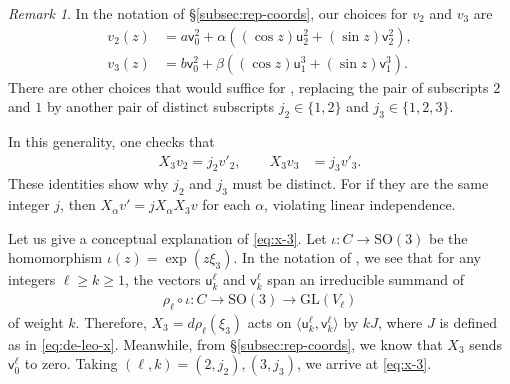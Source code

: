 \documentclass[a4paper,10pt,leqno]{article}
\numberwithin{equation}{section}
\theoremstyle{plain}
\theoremstyle{definition}
\theoremstyle{remark}
\newtheorem{rem}[thm]{Remark}
\renewcommand{\sf}{\mathsf}
\newcommand{\GL}{\mathrm{GL}}
\newcommand{\SO}{\mathrm{SO}}
\begin{document}
\begin{rem}
In the notation of \S\ref{subsec:rep-coords}, our choices for $v_2$ and $v_3$ are
\begin{align}
v_2(z) &= a\sf{v}_0^2 + \alpha ((\cos z) \sf{u}_2^2 + (\sin z) \sf{v}_2^2),\\
v_3(z) &= b\sf{v}_0^2 + \beta ((\cos z) \sf{u}_1^3 + (\sin z) \sf{v}_1^3).
\end{align}
There are other choices that would suffice for , replacing the pair of subscripts $2$ and $1$ by another pair of distinct subscripts $j_2 \in \{1,2\}$ and $j_3 \in \{1,2,3\}$.

In this generality, one checks that
\begin{align}\label{eq:x-3}
X_3 v_2 = j_2 v'_2,\qquad 
X_3 v_3 &= j_3 v'_3.
\end{align} 
These identities show why $j_2$ and $j_3$ must be distinct.
For if they are the same integer $j$, then $X_\alpha v' = j X_\alpha X_3 v$ for each $\alpha$, violating linear independence.

Let us give a conceptual explanation of \eqref{eq:x-3}.
Let $\iota \colon C \to \SO(3)$ be the homomorphism $\iota(z) = \exp(z \xi_3)$.
In the notation of , we see that for any integers $\ell \geq k \geq 1$, the vectors $\sf{u}_k^\ell$ and $\sf{v}_k^\ell$ span an irreducible summand of 
\begin{align}
\rho_\ell \circ \iota \colon C \to \SO(3) \to \GL(V_\ell)
\end{align}
of weight $k$.
Therefore, $X_3 = d\rho_\ell(\xi_3)$ acts on $\langle\sf{u}_k^\ell, \sf{v}_k^\ell\rangle$ by $kJ$, where $J$ is defined as in \eqref{eq:de-leo-x}.
Meanwhile, from \S\ref{subsec:rep-coords}, we know that $X_3$ sends $\sf{v}_0^\ell$ to zero.
Taking $(\ell, k) = (2, j_2), (3, j_3)$, we arrive at \eqref{eq:x-3}.
\end{rem}
\end{document}
